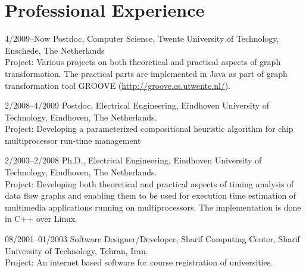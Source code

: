 \section{Professional Experience}

\begin{CV}
\item[4/2009--Now]Postdoc, Computer Science, Twente University of
Technology, Enschede, The Netherlands \\
\ifindustry
Project: Various projects on both theoretical and practical aspects of graph transformation. The practical
parts are implemented in Java as part of graph transformation tool GROOVE (\url{http://groove.cs.utwente.nl/}).
\fi
\item[2/2008--4/2009] Postdoc, Electrical Engineering, Eindhoven University
of Technology, Eindhoven, The Netherlands. \\
\ifindustry
Project: Developing a parameterized compositional heuristic algorithm for chip multiprocessor run-time management 
\fi

\item[2/2003--2/2008] Ph.D., Electrical Engineering, Eindhoven
University of Technology, Eindhoven, The Netherlands.\\
\ifindustry
Project: Developing both theoretical and practical aspects of timing analysis of data flow graphs
and enabling them to be used for execution time estimation of multimedia applications running on multiprocessors.
The implementation is done in C++ over Linux.
\fi

\item[08/2001--01/2003] Software Designer/Developer, Sharif Computing Center, Sharif University of Technology, Tehran,
Iran.\\
\ifindustry
Project: An internet based software for course registration of
universities.
\fi
\end{CV}
